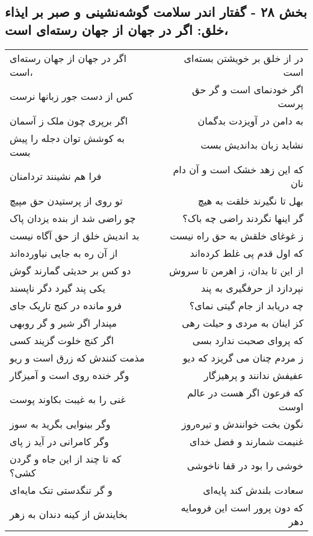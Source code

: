 \begin{center}
\section*{بخش ۲۸ - گفتار اندر سلامت گوشه‌نشینی و صبر  بر ایذاء خلق: اگر در جهان از جهان رسته‌ای است،}
\label{sec:028}
\begin{longtable}{l p{0.5cm} r}
اگر در جهان از جهان رسته‌ای است،
&&
در از خلق بر خویشتن بسته‌ای است
\\
کس از دست جور زبانها نرست
&&
اگر خودنمای است و گر حق پرست
\\
اگر برپری چون ملک ز آسمان
&&
به دامن در آویزدت بدگمان
\\
به کوشش توان دجله را پیش بست
&&
نشاید زبان بداندیش بست
\\
فرا هم نشینند تردامنان
&&
که این زهد خشک است و آن دام نان
\\
تو روی از پرستیدن حق مپیچ
&&
بهل تا نگیرند خلقت به هیچ
\\
چو راضی شد از بنده یزدان پاک
&&
گر اینها نگردند راضی چه باک؟
\\
بد اندیش خلق از حق آگاه نیست
&&
ز غوغای خلقش به حق راه نیست
\\
از آن ره به جایی نیاورده‌اند
&&
که اول قدم پی غلط کرده‌اند
\\
دو کس بر حدیثی گمارند گوش
&&
از این تا بدان، ز اهرمن تا سروش
\\
یکی پند گیرد دگر ناپسند
&&
نپردازد از حرفگیری به پند
\\
فرو مانده در کنج تاریک جای
&&
چه دریابد از جام گیتی نمای؟
\\
مپندار اگر شیر و گر روبهی
&&
کز اینان به مردی و حیلت رهی
\\
اگر کنج خلوت گزیند کسی
&&
که پروای صحبت ندارد بسی
\\
مذمت کنندش که زرق است و ریو
&&
ز مردم چنان می گریزد که دیو
\\
وگر خنده روی است و آمیزگار
&&
عفیفش ندانند و پرهیزگار
\\
غنی را به غیبت بکاوند پوست
&&
که فرعون اگر هست در عالم اوست
\\
وگر بینوایی بگرید به سوز
&&
نگون بخت خوانندش و تیره‌روز
\\
وگر کامرانی در آید ز پای
&&
غنیمت شمارند و فضل خدای
\\
که تا چند از این جاه و گردن کشی؟
&&
خوشی را بود در قفا ناخوشی
\\
و گر تنگدستی تنک مایه‌ای
&&
سعادت بلندش کند پایه‌ای
\\
بخایندش از کینه دندان به زهر
&&
که دون پرور است این فرومایه دهر

\end{longtable}
\end{center}
